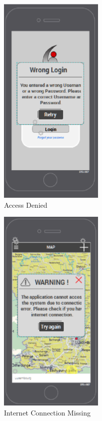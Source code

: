 \begin{figure}[htbp]
\begin{center}
 \caption{\label{fig:E1} Access Denied}
   \includegraphics[width=50mm]{./images/Errors/accessdenied.eps}
\end{center}
\end{figure}

\begin{figure}[htbp] 
\begin{center}
 \caption{\label{fig:E2} Internet Connection Missing}
   \includegraphics[width=50mm]{./images/Errors/internetcon.eps}
\end{center}
\end{figure}


